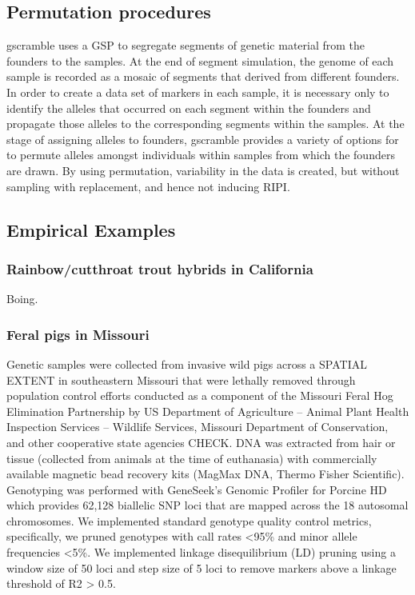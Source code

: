 \subsection*{Permutation procedures}

gscramble uses a GSP to segregate segments of genetic material from the founders
to the samples.  At the end of segment simulation, the genome of each sample
is recorded as a mosaic of segments that derived from different founders.  In order
to create a data set of markers in each sample, it is necessary only to identify the alleles
that occurred on each segment within the founders and propagate those alleles to the
corresponding segments within the samples.  At the stage of assigning alleles to
founders, gscramble provides a variety of options for to permute alleles amongst
individuals within samples from which the founders are drawn.  By using permutation,
variability in the data is created, but without sampling with replacement, and hence
not inducing RIPI.  


\subsection*{Empirical Examples}

\subsubsection*{Rainbow/cutthroat trout hybrids in California}

Boing.

\subsubsection*{Feral pigs in Missouri}

Genetic samples were collected from invasive wild pigs across a SPATIAL EXTENT in southeastern Missouri that were lethally removed through population control efforts conducted as a component of the Missouri Feral Hog Elimination Partnership
by US Department of Agriculture – Animal Plant Health Inspection Services – Wildlife Services, Missouri Department of Conservation, and other cooperative state agencies CHECK.
DNA was extracted from hair or tissue (collected from animals at the time of euthanasia) with commercially available magnetic bead recovery kits (MagMax DNA, Thermo Fisher Scientific).
Genotyping was performed with GeneSeek’s Genomic Profiler for Porcine HD which provides 62,128 biallelic SNP loci that are mapped across the 18 autosomal chromosomes.
We implemented standard genotype quality control metrics, specifically, we pruned genotypes with call rates <95\% and minor allele frequencies <5\%.
We implemented linkage disequilibrium (LD) pruning using a window size of 50 loci and step size of 5 loci to remove markers above a linkage threshold of R2 > 0.5.

